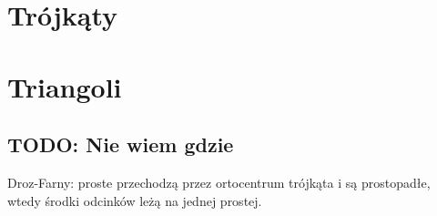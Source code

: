 %

\chapter{Trójkąty} %
\chapter{Triangoli} %












\section{TODO: Nie wiem gdzie}
Droz-Farny: proste przechodzą przez ortocentrum trójkąta i są prostopadłe, wtedy środki odcinków leżą na jednej prostej. %

%